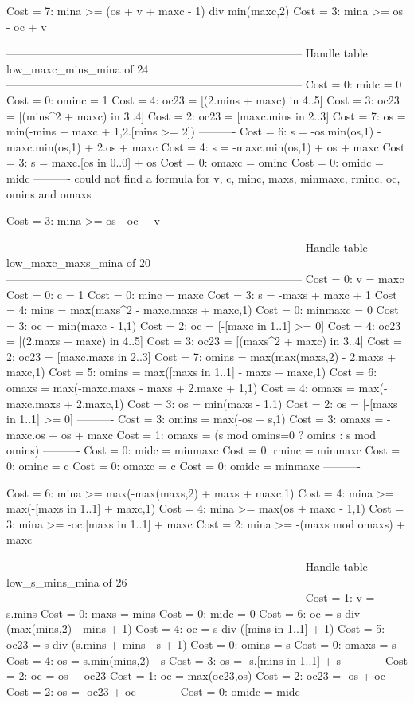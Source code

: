 Cost =  7:  mina >= (os + v + maxc - 1) div min(maxc,2)
Cost =  3:  mina >= os - oc + v

--------------------------------------------------------------------------------
Handle table low_maxc_mins_mina of 24
--------------------------------------------------------------------------------
Cost =  0:  midc    = 0
Cost =  0:  ominc   = 1
Cost =  4:  oc23    = [(2.mins + maxc) in 4..5]
Cost =  3:  oc23    = [(mins^2 + maxc) in 3..4]
Cost =  2:  oc23    = [maxc.mins in 2..3]
Cost =  7:  os      = min(-mins + maxc + 1,2.[mins >= 2])
----------
Cost =  6:  s       = -os.min(os,1) - maxc.min(os,1) + 2.os + maxc
Cost =  4:  s       = -maxc.min(os,1) + os + maxc
Cost =  3:  s       = maxc.[os in 0..0] + os
Cost =  0:  omaxc   = ominc
Cost =  0:  omidc   = midc
----------
could not find a formula for v, c, minc, maxs, minmaxc, rminc, oc, omins and omaxs

Cost =  3:  mina >= os - oc + v

--------------------------------------------------------------------------------
Handle table low_maxc_maxs_mina of 20
--------------------------------------------------------------------------------
Cost =  0:  v       = maxc
Cost =  0:  c       = 1
Cost =  0:  minc    = maxc
Cost =  3:  s       = -maxs + maxc + 1
Cost =  4:  mins    = max(maxs^2 - maxc.maxs + maxc,1)
Cost =  0:  minmaxc = 0
Cost =  3:  oc      = min(maxc - 1,1)
Cost =  2:  oc      = [-[maxc in 1..1] >= 0]
Cost =  4:  oc23    = [(2.maxs + maxc) in 4..5]
Cost =  3:  oc23    = [(maxs^2 + maxc) in 3..4]
Cost =  2:  oc23    = [maxc.maxs in 2..3]
Cost =  7:  omins   = max(max(maxs,2) - 2.maxs + maxc,1)
Cost =  5:  omins   = max([maxs in 1..1] - maxs + maxc,1)
Cost =  6:  omaxs   = max(-maxc.maxs - maxs + 2.maxc + 1,1)
Cost =  4:  omaxs   = max(-maxc.maxs + 2.maxc,1)
Cost =  3:  os      = min(maxs - 1,1)
Cost =  2:  os      = [-[maxs in 1..1] >= 0]
----------
Cost =  3:  omins   = max(-os + s,1)
Cost =  3:  omaxs   = -maxc.os + os + maxc
Cost =  1:  omaxs   = (s mod omins=0 ? omins : s mod omins)
----------
Cost =  0:  midc    = minmaxc
Cost =  0:  rminc   = minmaxc
Cost =  0:  ominc   = c
Cost =  0:  omaxc   = c
Cost =  0:  omidc   = minmaxc
----------

Cost =  6:  mina >= max(-max(maxs,2) + maxs + maxc,1)
Cost =  4:  mina >= max(-[maxs in 1..1] + maxc,1)
Cost =  4:  mina >= max(os + maxc - 1,1)
Cost =  3:  mina >= -oc.[maxs in 1..1] + maxc
Cost =  2:  mina >= -(maxs mod omaxs) + maxc

--------------------------------------------------------------------------------
Handle table low_s_mins_mina of 26
--------------------------------------------------------------------------------
Cost =  1:  v     = s.mins
Cost =  0:  maxs  = mins
Cost =  0:  midc  = 0
Cost =  6:  oc    = s div (max(mins,2) - mins + 1)
Cost =  4:  oc    = s div ([mins in 1..1] + 1)
Cost =  5:  oc23  = s div (s.mins + mins - s + 1)
Cost =  0:  omins = s
Cost =  0:  omaxs = s
Cost =  4:  os    = s.min(mins,2) - s
Cost =  3:  os    = -s.[mins in 1..1] + s
----------
Cost =  2:  oc    = os + oc23
Cost =  1:  oc    = max(oc23,os)
Cost =  2:  oc23  = -os + oc
Cost =  2:  os    = -oc23 + oc
----------
Cost =  0:  omidc = midc
----------

